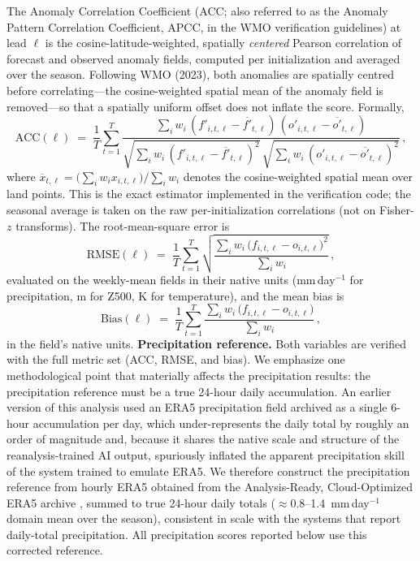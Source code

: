 \documentclass[11pt,a4paper]{article}
\begin{document}
The Anomaly Correlation Coefficient (ACC; also referred to as the
Anomaly Pattern Correlation Coefficient, APCC, in the WMO verification
guidelines) at lead $\ell$ is the cosine-latitude-weighted, spatially
\emph{centered} Pearson correlation of forecast and observed anomaly
fields, computed per initialization and averaged over the season.
Following WMO (2023), both anomalies are spatially centred before
correlating---the cosine-weighted spatial mean of the anomaly field is
removed---so that a spatially uniform offset does not inflate the score.
Formally,
\begin{equation}
  \mathrm{ACC}(\ell) \;=\; \frac{1}{T}\sum_{t=1}^{T}
  \frac{\sum_i w_i\,(f'_{i,t,\ell}-\overline{f'}_{t,\ell})\,
                     (o'_{i,t,\ell}-\overline{o'}_{t,\ell})}
       {\sqrt{\sum_i w_i\,(f'_{i,t,\ell}-\overline{f'}_{t,\ell})^{2}}\,
        \sqrt{\sum_i w_i\,(o'_{i,t,\ell}-\overline{o'}_{t,\ell})^{2}}}\,,
  \label{eq:acc}
\end{equation}
where $\overline{x}_{t,\ell}=\big(\sum_i w_i x_{i,t,\ell}\big)/\sum_i w_i$
denotes the cosine-weighted spatial mean over land points. This is the
exact estimator implemented in the verification code; the seasonal
average is taken on the raw per-initialization correlations (not on
Fisher-$z$ transforms). The root-mean-square error is
\begin{equation}
  \mathrm{RMSE}(\ell) \;=\; \frac{1}{T}\sum_{t=1}^{T}
  \sqrt{\frac{\sum_i w_i\,\bigl(f_{i,t,\ell}-o_{i,t,\ell}\bigr)^{2}}
             {\sum_i w_i}}\,,
  \label{eq:rmse}
\end{equation}
evaluated on the weekly-mean fields in their native units
(mm\,day$^{-1}$ for precipitation, m for Z500, K for temperature), and
the mean bias is
\begin{equation}
  \mathrm{Bias}(\ell) \;=\; \frac{1}{T}\sum_{t=1}^{T}
  \frac{\sum_i w_i\,\bigl(f_{i,t,\ell}-o_{i,t,\ell}\bigr)}
       {\sum_i w_i}\,,
  \label{eq:bias}
\end{equation}
in the field's native units. \textbf{Precipitation reference.} Both
variables are verified with the full metric set (ACC, RMSE, and bias).
We emphasize one methodological point that materially affects the
precipitation results: the precipitation reference must be a true
24-hour daily accumulation. An earlier version of this analysis used an
ERA5 precipitation field archived as a single 6-hour accumulation per
day, which under-represents the daily total by roughly an order of
magnitude and, because it shares the native scale and structure of the
reanalysis-trained AI output, spuriously inflated the apparent
precipitation skill of the system trained to emulate ERA5. We therefore
construct the precipitation reference from hourly ERA5 obtained from the
Analysis-Ready, Cloud-Optimized ERA5 archive
\citep[ARCO-ERA5;][]{carver2023}, summed to true 24-hour daily totals
($\approx$0.8--1.4~mm\,day$^{-1}$ domain mean over the season),
consistent in scale with the systems that report daily-total
precipitation. All precipitation scores reported below use this
corrected reference.
\end{document}

